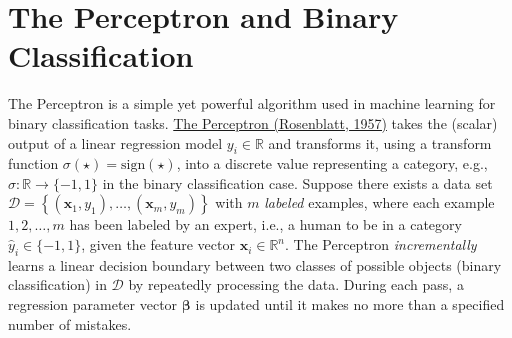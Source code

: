 \documentclass{article}[11pt]
\begin{document}
\section{The Perceptron and Binary Classification}
The Perceptron \cite{Perceptron1960} is a simple yet powerful algorithm used in machine learning for binary classification tasks.
\href{https://en.wikipedia.org/wiki/Perceptron}{The Perceptron (Rosenblatt, 1957)} takes the (scalar) output of a linear regression model $y_{i}\in\mathbb{R}$ and transforms it, using a transform function $\sigma(\star) = \text{sign}(\star)$, into a discrete value representing a category, e.g., $\sigma:\mathbb{R}\rightarrow\{-1,1\}$ in the binary classification case. 
Suppose there exists a data set $\mathcal{D} = \left\{(\mathbf{x}_{1},y_{1}),\dotsc,(\mathbf{x}_{m},y_{m})\right\}$ with $m$ \textit{labeled} examples, where each example $1,2,\dots,m$ has been labeled by an expert, i.e., a human to be in a category $\hat{y}_{i}\in\{-1,1\}$, given the feature vector $\mathbf{x}_{i}\in\mathbb{R}^{n}$. 
The Perceptron \textit{incrementally} learns a linear decision boundary between two classes of possible objects (binary classification) in $\mathcal{D}$ by repeatedly processing the data. 
During each pass, a regression parameter vector $\mathbf{\beta}$ is updated until it makes no more than a specified number of mistakes. 
\end{document}

